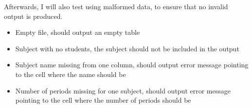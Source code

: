 \documentclass[12pt]{article}
\begin{document}
Afterwards, I will also test using malformed data, to ensure that no invalid output is
produced. 
%
\begin{itemize}
    \item Empty file, should output an empty table
    \item Subject with no students, the subject should not be included in the output
    \item Subject name missing from one column, should output error message pointing to the
        cell where the name should be
    \item Number of periods missing for one subject, should output error message pointing to
        the cell where the number of periods should be
\end{itemize}
%
\end{document}
